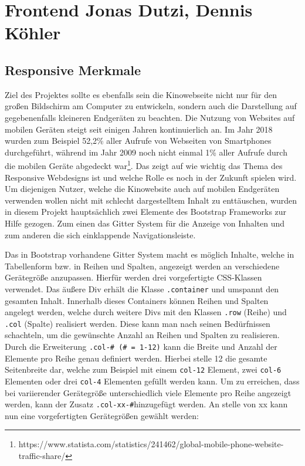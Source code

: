 	
	\section[Frontend]{Frontend {\hfill \normalsize Jonas Dutzi, Dennis Köhler}}
	
	\subsection{Responsive Merkmale}
	Ziel des Projektes sollte es ebenfalls sein die Kinowebseite nicht nur für den großen Bildschirm am Computer zu entwickeln, sondern auch die Darstellung auf gegebenenfalls kleineren Endgeräten zu beachten. Die Nutzung von Websites auf mobilen Geräten steigt seit einigen Jahren kontinuierlich an. Im Jahr 2018 wurden zum Beispiel 52,2\% aller Aufrufe von Webseiten von Smartphones durchgeführt, während im Jahr 2009 noch nicht einmal 1\% aller Aufrufe durch die mobilen Geräte abgedeckt war\footnote{https://www.statista.com/statistics/241462/global-mobile-phone-website-traffic-share/}. Das zeigt auf wie wichtig das Thema des Responsive Webdesigns ist und welche Rolle es noch in der Zukunft spielen wird. Um diejenigen Nutzer, welche die Kinowebsite auch auf mobilen Endgeräten verwenden wollen nicht mit schlecht dargestelltem Inhalt zu enttäuschen, wurden in diesem Projekt hauptsächlich zwei Elemente des Bootstrap Frameworks zur Hilfe gezogen. Zum einen das Gitter System für die Anzeige von Inhalten und zum anderen die sich einklappende Navigationsleiste.
	
	Das in Bootstrap vorhandene Gitter System macht es möglich Inhalte, welche in Tabellenform bzw. in Reihen und Spalten, angezeigt werden an verschiedene Gerätegröße anzupassen. Hierfür werden drei vorgefertigte CSS-Klassen verwendet. Das äußere Div erhält die Klasse \texttt{.container} und umspannt den gesamten Inhalt. Innerhalb dieses Containers können Reihen und Spalten angelegt werden, welche durch weitere Divs mit den Klassen \texttt{.row} (Reihe) und \texttt{.col} (Spalte) realisiert werden. Diese kann man nach seinen Bedürfnissen schachteln, um die gewünschte Anzahl an Reihen und Spalten zu realisieren. Durch die Erweiterung \texttt{.col-\# (\# = 1-12)} kann die Breite und Anzahl der Elemente pro Reihe genau definiert werden. Hierbei stelle 12 die gesamte Seitenbreite dar, welche zum Beispiel mit einem 
	\texttt{col-12}  Element, zwei \texttt{col-6} Elementen oder drei \texttt{col-4} Elementen gefüllt werden kann. Um zu erreichen, dass bei variierender Gerätegröße unterschiedlich viele Elemente pro Reihe angezeigt werden, kann der Zusatz \texttt{.col-xx-\#}hinzugefügt werden. An stelle von xx kann nun eine vorgefertigten Gerätegrößen gewählt werden:
	
